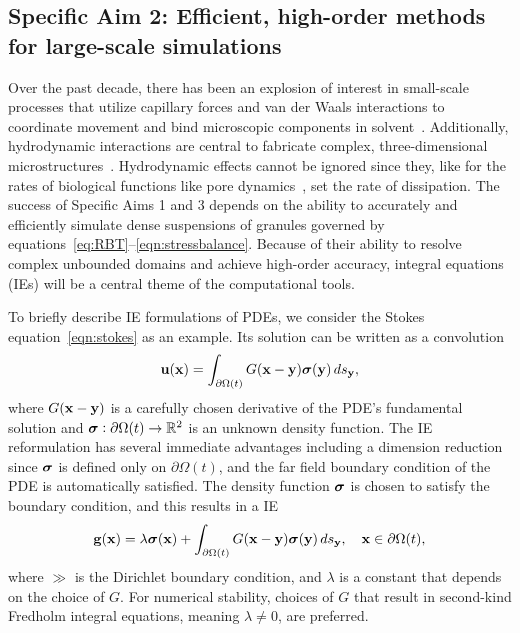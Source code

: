 \subsection{Specific Aim 2: Efficient, high-order methods for
large-scale simulations}
\label{sec:specificaim2}
Over the past decade, there has been an explosion of interest in
small-scale processes that utilize capillary forces and van der Waals
interactions to coordinate movement and bind microscopic components in
solvent~\cite{Pandey2011, Zhang2017, Siontorou2017}. Additionally,
hydrodynamic interactions are central to fabricate complex,
three-dimensional microstructures~\cite{Dasgupta2017, Leong2007,
Reynolds2019, Cho2010}. Hydrodynamic effects cannot be ignored since
they, like for the rates of biological functions like pore
dynamics~\cite{RYHAM20112929}, set the rate of dissipation. The success
of Specific Aims 1 and 3 depends on the ability to accurately and
efficiently simulate dense suspensions of granules governed by
equations~\eqref{eq:RBT}--\eqref{eqn:stressbalance}. Because of their
ability to resolve complex unbounded domains and achieve high-order
accuracy, integral equations (IEs) will be a central theme of the
computational tools. 

To briefly describe IE formulations of PDEs, we consider the Stokes
equation~\eqref{eqn:stokes} as an example. Its solution can be written
as a convolution 
\begin{align*}
  \mathbf{u}(\mathbf{x}) = \int_{\partial\Omega(t)} G(\mathbf{x} - \mathbf{y}) \boldsymbol{\sigma}(\mathbf{y}) \, ds_{\mathbf{y}},
\end{align*}
where $G(\mathbf{x} - \mathbf{y})$ is a carefully chosen derivative of the PDE's
fundamental solution and $\boldsymbol{\sigma}: \partial \Omega(t) \rightarrow \mathbb{R}^2$
is an unknown density function. The IE reformulation has several
immediate advantages including a dimension reduction since $\boldsymbol{\sigma}$ is
defined only on $\partial \Omega(t)$, and the far field boundary
condition of the PDE is automatically satisfied. The density
function $\boldsymbol{\sigma}$ is chosen to satisfy the boundary condition, and this
results in a IE 
\begin{align*}
  \mathbf{g}(\mathbf{x}) = \lambda \boldsymbol{\sigma}(\mathbf{x}) + 
    \int_{\partial\Omega(t)} G(\mathbf{x} - \mathbf{y}) \boldsymbol{\sigma}(\mathbf{y}) \, ds_{\mathbf{y}},
    \quad \mathbf{x} \in \partial\Omega(t),
\end{align*}
where $\gg$ is the Dirichlet boundary condition, and $\lambda$ is a
constant that depends on the choice of $G$. For numerical stability,
choices of $G$ that result in second-kind Fredholm integral equations,
meaning $\lambda \neq 0$, are preferred.


